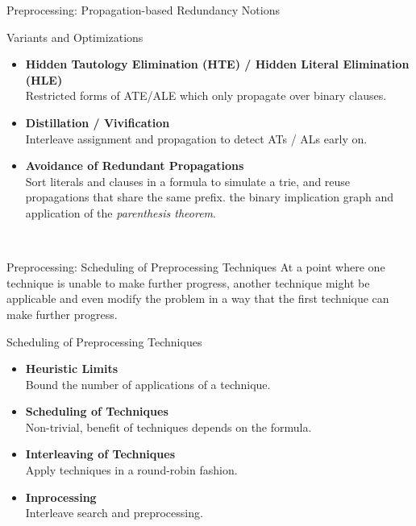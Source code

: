 \documentclass[t]{sdqbeamer}
\begin{document}
\begin{frame}{Preprocessing: Propagation-based Redundancy Notions}
\begin{block}{Variants and Optimizations}~\\
\begin{itemize}\setlength{\itemsep}{1em}
    \item \textbf{Hidden Tautology Elimination (HTE) / Hidden Literal Elimination (HLE)}\\[1pt]
    Restricted forms of ATE/ALE which only propagate over binary clauses.
    \item \textbf{Distillation / Vivification}\\[1pt]
    Interleave assignment and propagation to detect ATs / ALs early on.
    \item \textbf{Avoidance of Redundant Propagations}\\[1pt]
    Sort literals and clauses in a formula to simulate a trie, and reuse propagations that share the same prefix.
    the binary implication graph and application of the \emph{parenthesis theorem}.
\end{itemize}~\\
\end{block}
\end{frame}

\begin{frame}{Preprocessing: Scheduling of Preprocessing Techniques}
At a point where one technique is unable to make further progress, another technique might be applicable and even modify the problem in a way that the first technique can make further progress.\\[1ex]

\begin{block}{Scheduling of Preprocessing Techniques}
\begin{itemize}\setlength{\itemsep}{1ex}
    \item \textbf{Heuristic Limits}\\[1pt]
    Bound the number of applications of a technique.
    \item \textbf{Scheduling of Techniques}\\[1pt]
    Non-trivial, benefit of techniques depends on the formula.
    \item \textbf{Interleaving of Techniques}\\[1pt]
    Apply techniques in a round-robin fashion.
    \item \textbf{Inprocessing}\\[1pt]
    Interleave search and preprocessing.
\end{itemize}
\end{block}
\end{frame}
    
\end{document}
